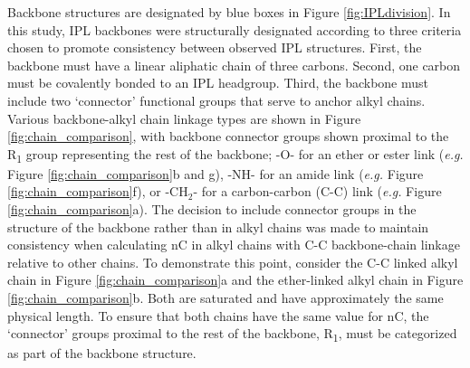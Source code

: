 Backbone structures are designated by blue boxes in Figure \ref{fig:IPLdivision}. In this study, IPL backbones were structurally designated according to three criteria chosen to promote consistency between observed IPL structures. First, the backbone must have a linear aliphatic chain of three carbons. Second, one carbon must be covalently bonded to an IPL headgroup. Third, the backbone must include two `connector' functional groups that serve to anchor alkyl chains. Various backbone-alkyl chain linkage types are shown in Figure \ref{fig:chain_comparison}, with backbone connector groups shown proximal to the R\textsubscript{1} group representing the rest of the backbone; -O- for an ether or ester link (\textit{e.g.} Figure \ref{fig:chain_comparison}b and g), -NH- for an amide link (\textit{e.g.} Figure \ref{fig:chain_comparison}f), or -CH$_{2}$- for a carbon-carbon (C-C) link (\textit{e.g.} Figure \ref{fig:chain_comparison}a). The decision to include connector groups in the structure of the backbone rather than in alkyl chains was made to maintain consistency when calculating nC in alkyl chains with C-C backbone-chain linkage relative to other chains. To demonstrate this point, consider the C-C linked alkyl chain in Figure \ref{fig:chain_comparison}a and the ether-linked alkyl chain in Figure \ref{fig:chain_comparison}b. Both are saturated and have approximately the same physical length. To ensure that both chains have the same value for nC, the `connector' groups proximal to the rest of the backbone, R\textsubscript{1}, must be categorized as part of the backbone structure.

